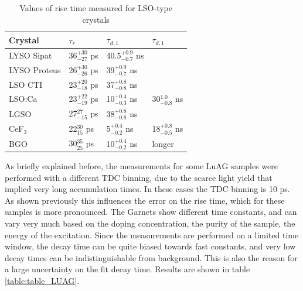 
\begin{table}[h]
\begin{center}
\begin{tabular}{|l|l|l|l|}
\hline
Crystal  & $\tau _{r}$ & $\tau _{d, 1}$ & $\tau _{d, 1}$ \\
\hline
LYSO Sipat      & 36$_{-27}^{+30}$ ps         & 40.5$_{-0.7}^{+0.9}$ ns  & \\
\hline
LYSO Proteus     & 26$_{-26}^{+30}$ ps         & 39$_{-0.7}^{+0.9}$ ns & \\ 
\hline
LSO CTI      & 23$_{-18}^{+20}$ ps         & 37$_{-0.8}^{+0.8}$ ns  & \\ 
\hline
LSO:Ca      & 23$_{-19}^{+22}$ ps         & 10$_{-0.3}^{+0.4}$ ns  & 30$_{-0.8}^{1.0}$ ns \\ 
\hline
LGSO & 27$_{-15}^{27}$ ps         & 38$_{-0.8}^{+0.8}$ ns & \\  
\hline
CeF$_{3}$      & 22$_{15}^{30}$ ps         & 5$_{-0.2}^{+0.4}$ ns  & 18$_{-0.5}^{+0.8}$ ns \\
\hline
BGO      & 30$_{25}^{35}$ ps         & 10$_{-0.2}^{+0.4}$ ns  & longer \\
\hline
\end{tabular}
\end{center}
\caption[Rise time values for LSO crystals with VUV excitation]{Values of rise time measured for LSO-type crystals}
\label{table:table_LSO}
\end{table}

As briefly explained before, the measurements for some LuAG samples were performed with a different TDC binning, due to the scarce light yield that implied very long accumulation times. In these cases the TDC binning is 10 ps. As shown previously this influences the error on the rise time, which for these samples is more pronounced.
The Garnets show different time constants, and can vary very much based on the doping concentration, the purity of the sample, the energy of the excitation. Since the measurements are performed on a limited time window, the decay time can be quite biased towards fast constants, and very low decay times can be indistinguishable from background. This is also the reason for a large uncertainty on the fit decay time.
Results are shown in table \ref{table:table_LUAG}.

